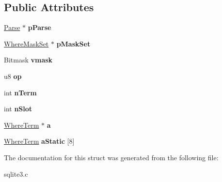 \subsection*{Public Attributes}
\begin{DoxyCompactItemize}
\item 
\hypertarget{struct_where_clause_a3ff6dfc93e7b9b97a9bf9a0618a1d542}{\hyperlink{struct_parse}{Parse} $\ast$ {\bfseries p\-Parse}}\label{struct_where_clause_a3ff6dfc93e7b9b97a9bf9a0618a1d542}

\item 
\hypertarget{struct_where_clause_ae308a1600721b7dfa0855136926a5554}{\hyperlink{struct_where_mask_set}{Where\-Mask\-Set} $\ast$ {\bfseries p\-Mask\-Set}}\label{struct_where_clause_ae308a1600721b7dfa0855136926a5554}

\item 
\hypertarget{struct_where_clause_aaef3dd42bb6c23890d8ad8824e2a00ee}{Bitmask {\bfseries vmask}}\label{struct_where_clause_aaef3dd42bb6c23890d8ad8824e2a00ee}

\item 
\hypertarget{struct_where_clause_a7a56a5fe1ab6603e930f3b5372ff2f71}{u8 {\bfseries op}}\label{struct_where_clause_a7a56a5fe1ab6603e930f3b5372ff2f71}

\item 
\hypertarget{struct_where_clause_ab84924c3c78af1ab387ab3919c5031c4}{int {\bfseries n\-Term}}\label{struct_where_clause_ab84924c3c78af1ab387ab3919c5031c4}

\item 
\hypertarget{struct_where_clause_ac92b93d65d4c3d9216707a049a4edb1c}{int {\bfseries n\-Slot}}\label{struct_where_clause_ac92b93d65d4c3d9216707a049a4edb1c}

\item 
\hypertarget{struct_where_clause_a140d726a3e20ac7b6853d539c59add72}{\hyperlink{struct_where_term}{Where\-Term} $\ast$ {\bfseries a}}\label{struct_where_clause_a140d726a3e20ac7b6853d539c59add72}

\item 
\hypertarget{struct_where_clause_a4acb8640bc9f42752900de5735bcd8e0}{\hyperlink{struct_where_term}{Where\-Term} {\bfseries a\-Static} \mbox{[}8\mbox{]}}\label{struct_where_clause_a4acb8640bc9f42752900de5735bcd8e0}

\end{DoxyCompactItemize}


The documentation for this struct was generated from the following file\-:\begin{DoxyCompactItemize}
\item 
sqlite3.\-c\end{DoxyCompactItemize}
